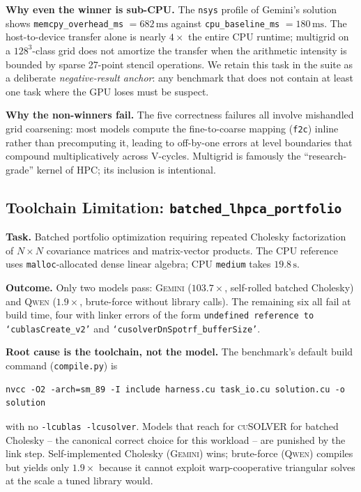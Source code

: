 \documentclass{article}
\begin{document}
\textbf{Why even the winner is sub-CPU.} The \texttt{nsys} profile
of Gemini's solution shows
\texttt{memcpy\_overhead\_ms} $=682\,\mathrm{ms}$ against
\texttt{cpu\_baseline\_ms} $=180\,\mathrm{ms}$. The host-to-device
transfer alone is nearly $4\times$ the entire CPU runtime; multigrid
on a $128^3$-class grid does not amortize the transfer when the
arithmetic intensity is bounded by sparse 27-point stencil
operations. We retain this task in the suite as a deliberate
\emph{negative-result anchor}: any benchmark that does not contain at
least one task where the GPU loses must be suspect.

\textbf{Why the non-winners fail.} The five correctness failures all
involve mishandled grid coarsening: most models compute the
fine-to-coarse mapping (\texttt{f2c}) inline rather than precomputing
it, leading to off-by-one errors at level boundaries that compound
multiplicatively across V-cycles. Multigrid is famously the
``research-grade'' kernel of HPC; its inclusion is intentional.

\subsection{Toolchain Limitation: \texttt{batched\_lhpca\_portfolio}}
\label{app:badcase-lhpca}

\textbf{Task.} Batched portfolio optimization requiring repeated
Cholesky factorization of $N{\times}N$ covariance matrices and
matrix-vector products. The CPU reference uses
\texttt{malloc}-allocated dense linear algebra; CPU \texttt{medium}
takes $19.8\,\mathrm{s}$.

\textbf{Outcome.} Only two models pass: \textsc{Gemini} ($103.7\times$,
self-rolled batched Cholesky) and \textsc{Qwen} ($1.9\times$,
brute-force without library calls). The remaining six all fail at
build time, four with linker errors of the form
\texttt{undefined reference to `cublasCreate\_v2'} and
\texttt{`cusolverDnSpotrf\_bufferSize'}.

\textbf{Root cause is the toolchain, not the model.} The benchmark's
default build command (\texttt{compile.py}) is
\begin{lstlisting}[basicstyle=\ttfamily\footnotesize]
nvcc -O2 -arch=sm_89 -I include harness.cu task_io.cu solution.cu -o solution
\end{lstlisting}
with no \texttt{-lcublas -lcusolver}. Models that reach for
\textsc{cuSOLVER} for batched Cholesky -- the canonical correct choice
for this workload -- are punished by the link step. Self-implemented
Cholesky (\textsc{Gemini}) wins; brute-force (\textsc{Qwen}) compiles
but yields only $1.9\times$ because it cannot exploit
warp-cooperative triangular solves at the scale a tuned library
would.
\end{document}
